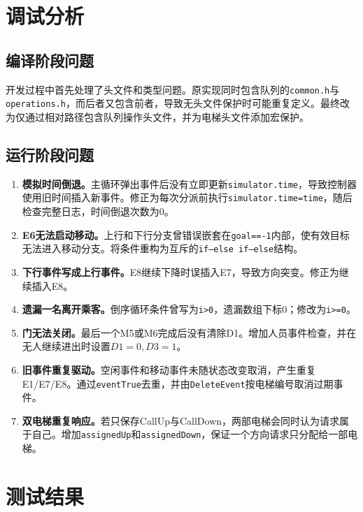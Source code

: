 \documentclass[UTF8,a4paper,12pt]{ctexart}
\begin{document}
\section{调试分析}

\subsection{编译阶段问题}

开发过程中首先处理了头文件和类型问题。原实现同时包含队列的\texttt{common.h}与\texttt{operations.h}，而后者又包含前者，导致无头文件保护时可能重复定义。最终改为仅通过相对路径包含队列操作头文件，并为电梯头文件添加宏保护。


\subsection{运行阶段问题}

\begin{enumerate}[label=\arabic*.]
    \item \textbf{模拟时间倒退。}主循环弹出事件后没有立即更新\texttt{simulator.time}，导致控制器使用旧时间插入新事件。修正为每次分派前执行\texttt{simulator.time=time}，随后检查完整日志，时间倒退次数为0。
    \item \textbf{E6无法启动移动。}上行和下行分支曾错误嵌套在\texttt{goal==-1}内部，使有效目标无法进入移动分支。将条件重构为互斥的\texttt{if--else if--else}结构。
    \item \textbf{下行事件写成上行事件。}E8继续下降时误插入E7，导致方向突变。修正为继续插入E8。
    \item \textbf{遗漏一名离开乘客。}倒序循环条件曾写为\texttt{i>0}，遗漏数组下标0；修改为\texttt{i>=0}。
    \item \textbf{门无法关闭。}最后一个M5或M6完成后没有清除D1。增加人员事件检查，并在无人继续进出时设置$D1=0,D3=1$。
    \item \textbf{旧事件重复驱动。}空闲事件和移动事件未随状态改变取消，产生重复E1/E7/E8。通过\texttt{eventTrue}去重，并由\texttt{DeleteEvent}按电梯编号取消过期事件。
    \item \textbf{双电梯重复响应。}若只保存CallUp与CallDown，两部电梯会同时认为请求属于自己。增加\texttt{assignedUp}和\texttt{assignedDown}，保证一个方向请求只分配给一部电梯。
\end{enumerate}

\section{测试结果}
\end{document}
